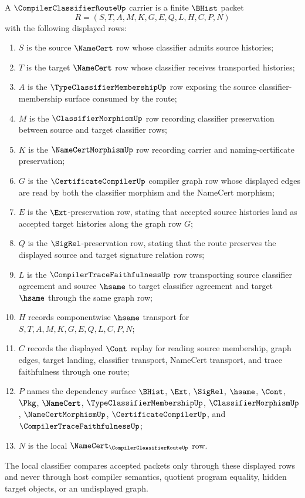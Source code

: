 \begin{definition}
\label{def:compiler-classifier-route-carrier}
A $\CompilerClassifierRouteUp$ carrier is a finite $\BHist$ packet
$$
R=(S,T,A,M,K,G,E,Q,L,H,C,P,N)
$$
with the following displayed rows:
\begin{enumerate}
\item $S$ is the source $\NameCert$ row whose classifier admits source histories;
\item $T$ is the target $\NameCert$ row whose classifier receives transported histories;
\item $A$ is the $\TypeClassifierMembershipUp$ row exposing the source classifier-membership surface consumed by the route;
\item $M$ is the $\ClassifierMorphismUp$ row recording classifier preservation between source and target classifier rows;
\item $K$ is the $\NameCertMorphismUp$ row recording carrier and naming-certificate preservation;
\item $G$ is the $\CertificateCompilerUp$ compiler graph row whose displayed edges are read by both the classifier morphism and the NameCert morphism;
\item $E$ is the $\Ext$-preservation row, stating that accepted source histories land as accepted target histories along the graph row $G$;
\item $Q$ is the $\SigRel$-preservation row, stating that the route preserves the displayed source and target signature relation rows;
\item $L$ is the $\CompilerTraceFaithfulnessUp$ row transporting source classifier agreement and source $\hsame$ to target classifier agreement and target $\hsame$ through the same graph row;
\item $H$ records componentwise $\hsame$ transport for $S,T,A,M,K,G,E,Q,L,C,P,N$;
\item $C$ records the displayed $\Cont$ replay for reading source membership, graph edges, target landing, classifier transport, NameCert transport, and trace faithfulness through one route;
\item $P$ names the dependency surface $\BHist$, $\Ext$, $\SigRel$, $\hsame$, $\Cont$, $\Pkg$, $\NameCert$, $\TypeClassifierMembershipUp$, $\ClassifierMorphismUp$, $\NameCertMorphismUp$, $\CertificateCompilerUp$, and $\CompilerTraceFaithfulnessUp$;
\item $N$ is the local $\NameCert_{\CompilerClassifierRouteUp}$ row.
\end{enumerate}
The local classifier compares accepted packets only through these displayed rows and never through host compiler semantics, quotient program equality, hidden target objects, or an undisplayed graph.
\end{definition}

